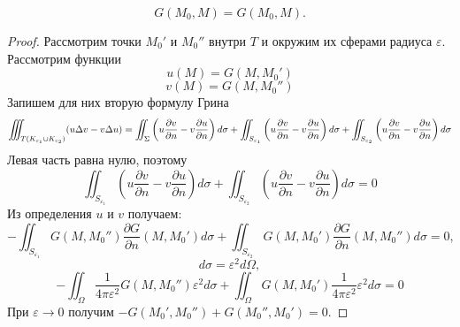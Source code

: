 \documentclass[11pt]{article}
\newcounter{th}\setcounter{th}{0}
\def\th{\par\smallskip\refstepcounter{th}\textbf{\arabic{th}}}
\newtheorem*{Theorem}{Теорема \th}
\begin{document}
\begin{Theorem}
\begin{equation}
G(M_0, M) = G(M_0, M).
\end{equation}
\begin{proof}
Рассмотрим точки $M_0'$ и $M_0''$ внутри $T$ и окружим их сферами радиуса $\varepsilon$.
Рассмотрим функции
\begin{equation}
u(M) = G(M, M_0')
\end{equation}
\begin{equation}
v(M) = G(M, M_0'')
\end{equation}
Запишем для них вторую формулу Грина
\begin{equation}
\iiint_{T\\(K_{\varepsilon_1} \cup K_{\varepsilon_2})}(u\Delta v - v\Delta u) =
\iint_{\Sigma}\left(u\frac{\partial v}{\partial n} - v\frac{\partial u}{\partial n}\right)d\sigma +
\iint_{S_{\varepsilon_1}}\left(u\frac{\partial v}{\partial n} - v\frac{\partial u}{\partial n}\right)d\sigma +
\iint_{S_{\varepsilon_2}}\left(u\frac{\partial v}{\partial n} - v\frac{\partial u}{\partial n}\right)d\sigma
\end{equation}
Левая часть равна нулю, поэтому
\begin{equation}
\iint_{S_{\varepsilon_1}}\left(u\frac{\partial v}{\partial n} - v\frac{\partial u}{\partial n}\right)d\sigma +
\iint_{S_{\varepsilon_2}}\left(u\frac{\partial v}{\partial n} - v\frac{\partial u}{\partial n}\right)d\sigma = 0
\end{equation}
Из определения $u$ и $v$ получаем:
\begin{equation}
-\iint_{S_{\varepsilon_1}}G(M, M_0'')\frac{\partial G}{\partial n}(M, M_0')d\sigma +
\iint_{S_{\varepsilon_2}}G(M, M_0')\frac{\partial G}{\partial n}(M, M_0'')d\sigma = 0,
\end{equation}
\begin{equation}
d\sigma = \varepsilon^2d\Omega,
\end{equation}
\begin{equation}
-\iint_{\Omega}\frac1{4\pi\varepsilon^2}G(M, M_0'')\varepsilon^2d\sigma +
\iint_{\Omega}G(M, M_0')\frac1{4\pi\varepsilon^2}\varepsilon^2d\sigma = 0
\end{equation}
При $\varepsilon \to 0$ получим $-G(M_0', M_0'') + G(M_0'', M_0') = 0$.
\end{proof}
\end{Theorem}
\end{document}
